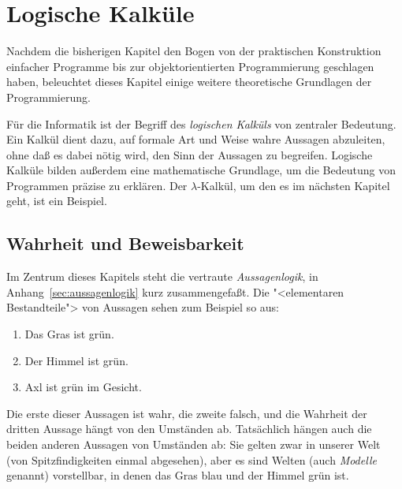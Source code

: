 
\chapter{Logische Kalküle}
\label{chap:calc}

Nachdem die bisherigen Kapitel den Bogen von der praktischen Konstruktion
einfacher Programme bis zur
objektorientierten Programmierung geschlagen haben, beleuchtet dieses Kapitel
einige weitere theoretische Grundlagen der
Programmierung.

Für die Informatik ist der Begriff des \emph{logischen Kalküls} von zentraler Bedeutung.
Ein Kalkül dient dazu, auf formale Art und Weise wahre Aussagen abzuleiten, ohne daß
es dabei nötig wird, den Sinn der Aussagen zu begreifen.   
Logische Kalküle bilden außerdem eine mathematische Grundlage, um die
Bedeutung von Programmen präzise zu erklären.  Der $\lambda$-Kalkül,
um den es im nächsten Kapitel geht, ist ein Beispiel.

\section{Wahrheit und Beweisbarkeit}
\label{sec:truth-provability}

Im Zentrum
dieses Kapitels steht die vertraute \textit{Aussagenlogik}, in
Anhang~\ref{sec:aussagenlogik} kurz zusammengefaßt.  Die "<elementaren
Bestandteile"> von Aussagen sehen zum Beispiel so aus:
%
\begin{enumerate}
\item Das Gras ist grün.
\item Der Himmel ist grün.
\item Axl ist grün im Gesicht.
\end{enumerate}
%
Die erste dieser Aussagen ist wahr, die zweite falsch, und die
Wahrheit der dritten Aussage hängt von den Umständen ab.  Tatsächlich
hängen auch die beiden anderen Aussagen von Umständen ab: Sie gelten zwar in
unserer Welt (von Spitzfindigkeiten einmal abgesehen), aber es sind
Welten (auch \textit{Modelle} genannt)
vorstellbar, in denen das Gras blau und der Himmel grün ist.

